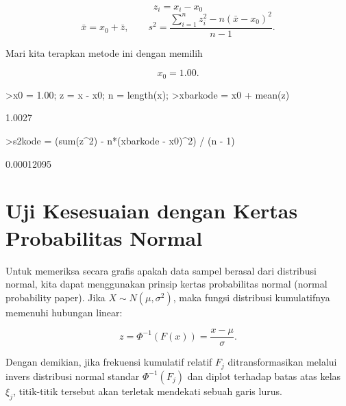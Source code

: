 \documentclass[a4paper,11pt,oneside,enabledeprecatedfontcommands]{scrbook}
\newenvironment{eulernotebook}{}{}
\newcommand{\eulerheading}[1]{\chapter{#1}}
\newenvironment{eulercomment}{\par\medskip\noindent}{\par\medskip}
\newenvironment{eulerformula}{}{}
\begin{document}
\begin{eulernotebook}
		\begin{eulerformula}
			\[
			z_i = x_i - x_0
			\]
		\end{eulerformula}
		\begin{eulerformula}
			\[
			\bar{x} = x_0 + \bar{z}, \qquad s^2 = \frac{\sum_{i=1}^n z_i^2 - n(\bar{x}-x_0)^2}{n-1}.
			\]
		\end{eulerformula}
		\begin{eulercomment}
			Mari kita terapkan metode ini dengan memilih
		\end{eulercomment}
		\begin{eulerformula}
			\[
			x_0 = 1.00.
			\]
		\end{eulerformula}
		\begin{eulerprompt}
			>x0 = 1.00; z = x - x0; n = length(x);
			>xbarkode = x0 + mean(z)
		\end{eulerprompt}
		\begin{euleroutput}
			1.0027
		\end{euleroutput}
		\begin{eulerprompt}
			>s2kode = (sum(z^2) - n*(xbarkode - x0)^2) / (n - 1)
		\end{eulerprompt}
		\begin{euleroutput}
			0.00012095
		\end{euleroutput}
		
		\eulerheading{Uji Kesesuaian dengan Kertas Probabilitas Normal}
		\begin{eulercomment}
			Untuk memeriksa secara grafis apakah data sampel berasal dari distribusi normal, kita dapat
			menggunakan prinsip kertas probabilitas normal (normal probability paper). Jika $X \sim N(\mu, \sigma^2)$,
			maka fungsi distribusi kumulatifnya memenuhi hubungan linear:
		\end{eulercomment}
		\begin{eulerformula}
			\[
			z = \Phi^{-1}(F(x)) = \frac{x - \mu}{\sigma}.
			\]
		\end{eulerformula}
		\begin{eulercomment}
			Dengan demikian, jika frekuensi kumulatif relatif $F_j$ ditransformasikan melalui invers distribusi
			normal standar $\Phi^{-1}(F_j)$ dan diplot terhadap batas atas kelas $\xi_j$,
			titik-titik tersebut akan terletak mendekati sebuah garis lurus.
			

\end{eulercomment}
\end{eulernotebook}
\end{document}
